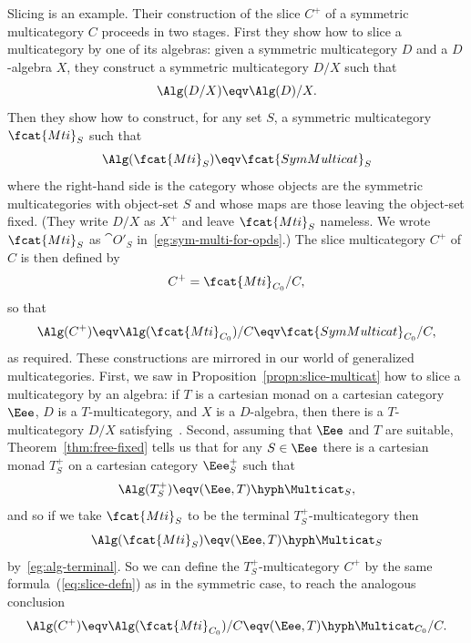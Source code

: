 Slicing is an example.  Their construction of the slice%
%
%
$C^+$ of a
symmetric multicategory $C$ proceeds in two stages.  First they show how to
slice%
%
%
a multicategory by one of its algebras: given a symmetric
multicategory $D$ and a $D$-algebra $X$, they construct a symmetric
multicategory $D/X$ such that
%
\begin{equation}	\label{eq:sym-slice-alg}
\Alg(D/X) \eqv \Alg(D)/X.
\end{equation}
%
Then they show how to construct, for any set $S$, a symmetric multicategory
$\fcat{Mti}_S$ such that
\[
\Alg(\fcat{Mti}_S) \eqv \fcat{SymMulticat}_S
\]
where the right-hand side is the category whose objects are the symmetric
multicategories with object-set $S$ and whose maps are those leaving the
object-set fixed.  (They write $D/X$ as $X^+$ and leave $\fcat{Mti}_S$
nameless.  We wrote $\fcat{Mti}_S$ as $\cat{O}'_S$
in~\ref{eg:sym-multi-for-opds}.)  The slice multicategory $C^+$ of $C$ is
then defined by
%
\begin{equation}	\label{eq:slice-defn}
C^+ = \fcat{Mti}_{C_0}/C,
\end{equation}
%
so that
\[
\Alg(C^+) \eqv 
\Alg(\fcat{Mti}_{C_0})/C \eqv 
\fcat{SymMulticat}_{C_0}/C,
\]
as required.  These constructions are mirrored in our world of generalized
multicategories.  First, we saw in Proposition~\ref{propn:slice-multicat}
how to slice%
%
%
a multicategory by an algebra: if $T$ is a cartesian monad on
a cartesian category $\Eee$, $D$ is a $T$-multicategory, and $X$ is a
$D$-algebra, then there is a $T$-multicategory $D/X$
satisfying~.  Second, assuming that $\Eee$ and $T$
are suitable, Theorem~\ref{thm:free-fixed} tells us that for any $S\in\Eee$
there is a cartesian monad $T^+_S$ on a cartesian category $\Eee^+_S$ such
that
\[
\Alg(T^+_S) \eqv (\Eee,T)\hyph\Multicat_S,
\]
and so if we take $\fcat{Mti}_S$%
%
%
to be the terminal $T^+_S$-multicategory
then
\[
\Alg(\fcat{Mti}_S) \eqv (\Eee,T)\hyph\Multicat_S
\]
by~\ref{eg:alg-terminal}.  So we can define the $T^+_S$-multicategory $C^+$
by the same formula~(\ref{eq:slice-defn}) as in the symmetric case, to
reach the analogous conclusion
\[
\Alg(C^+) \eqv 
\Alg(\fcat{Mti}_{C_0})/C \eqv 
(\Eee,T)\hyph\Multicat_{C_0}/C.
\]

